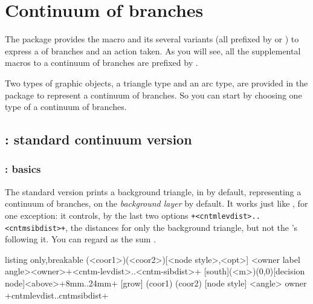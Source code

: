 \section{Continuum of branches}

\label{sec:cntm}

The package  provides the macro \cmd{\istrootcntm} and its several variants (all prefixed by \cmd{\istroot} or \cmd{\istrooto}) to express a  of branches and an action taken.
As you will see, all the supplemental macros to a continuum of branches are prefixed by \cmd{\cntm}.

Two types of graphic objects, a triangle type and an arc type, are provided in the package to represent a continuum of branches.
So you can start by choosing one type of a continuum of branches.

\subsection{\protect\cmd{\istrootcntm}:  standard continuum version}
\label{ssec:istrootcntm}

\subsubsection{\protect\cmd{\istrootcntm}: basics}

The standard version \icmd{\istrootcntm} prints a background triangle, in  by default, representing a continuum of branches, on the \emph{background layer} by default. It works just like \cmd{\istroot}, for one exception: it controls, by the last two options \verb|+<cntmlevdist>..<cntmsibdist>+|, the distances for only the background triangle, but not the \cmd{\istb}'s following it.
You can regard \cmd{\istrootcntm} as the sum \cmd{\istroot} \xw{+} .

\begin{tcblisting}{listing only,breakable}
  (<coor1>)(<coor2>)[<node style>,<opt>]%
               <owner label angle>{<owner>}+<cntm-levdist>..<cntm-sibdist>+
  [south](<m>)(0,0)[decision node]<above>{}+8mm..24mm+
  [grow] %
  (coor1) %
  (coor2) %
  [node style] %
  <angle> %
  {owner} %
  +cntmlevdist..cntmsibdist+ %
\end{tcblisting}

